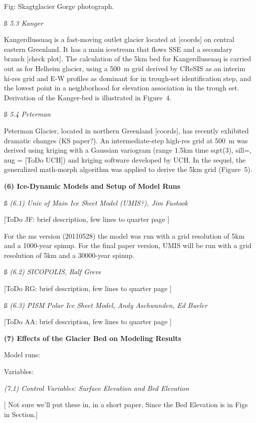 \documentclass[11pt]{article}
\begin{document}
Fig: Skagtglacier Gorge photograph.
 
  \ss
 {\it 5.3 Kanger}

Kangerdlussuaq is  a fast-moving outlet glacier located at [coords] on central eastern Greenland.
It has a main icestream that flows  SSE and a secondary branch  [check plot].
 The calculation of the 5km bed for Kangerdlussuaq is carried out as for Helheim glacier, using
  a 500~m grid derived by CReSIS  as an interim hi-res grid and E-W profiles as dominant for in trough-set
  identification step, and the lowest point in a neighborhood for elevation association in the trough set. 
    Derivation of the Kanger-bed is illustrated in Figure~4.
 
 
  \ss
 {\it 5.4 Peterman}
 
 Peterman Glacier, located in northern Greenland [coords], has recently exhibited dramatic changes (KS paper?).
 An intermediate-step high-res grid at 500~m was derived using kriging with  a Gaussian variogram 
 (range  1.5km time sqrt(3), sill=, nug = [ToDo UCH]) and kriging software developed by UCH.
 In the sequel, the generalized math-morph algorithm was applied to derive the 5km grid (Figure~5).
 
 \bs
 {\bf (6) Ice-Dynamic Models and Setup of Model Runs}
 
 \ss
 {\it (6.1)  Univ of Main Ice Sheet Model (UMIS?), Jim Fastook}
 
[ToDo JF: brief description, few lines to quarter page ]
 
 For the ms version (20110528) the model was run with a grid resolution of 5km and a 1000-year spinup.
 For the final paper version, UMIS will be run with a grid resolution of 5km and a 30000-year spinup.
 
 \ss
 {\it (6.2) SICOPOLIS, Ralf Greve}
 
 [ToDo RG: brief description, few lines to quarter page ]
 
 \ss
 {\it (6.3) PISM Polar Ice Sheet Model, Andy Aschwanden, Ed Bueler}
 
 [ToDo AA: brief description, few lines to quarter page ]
 
 \bs
 {\bf (7) Effects of the Glacier Bed on Modeling Results}
 
 
 Model runs:
 
 
 Variables: 
 
 
{\it (7.1)  Control Variables: Surface Elevation and Bed Elevation}
 
[ Not sure we'll put these in, in a short paper, Since the Bed Elevation is in Figs in Section.]
\end{document}
